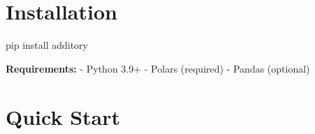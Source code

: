 \documentclass[
  letterpaper,
]{scrbook}
\newenvironment{Shaded}{\begin{snugshade}}{\end{snugshade}}
\newcommand{\ExtensionTok}[1]{\textcolor[rgb]{0.00,0.23,0.31}{#1}}
\newcommand{\NormalTok}[1]{\textcolor[rgb]{0.00,0.23,0.31}{#1}}
\begin{document}
\section*{Installation}\label{installation}


\begin{Shaded}
\begin{Highlighting}[]
\ExtensionTok{pip}\NormalTok{ install additory}
\end{Highlighting}
\end{Shaded}

\textbf{Requirements:} - Python 3.9+ - Polars (required) - Pandas
(optional)

\section*{Quick Start}\label{quick-start}

\end{document}
